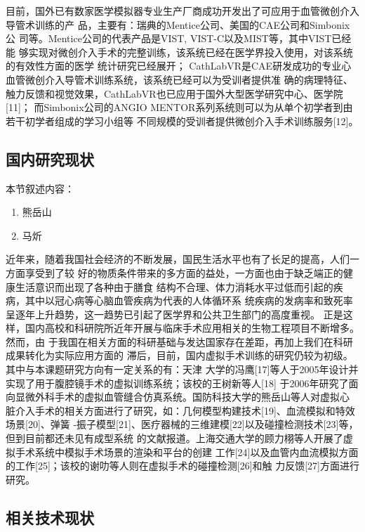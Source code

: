 目前，国外已有数家医学模拟器专业生产厂商成功开发出了可应用于血管微创介入导管术训练的产
品，主要有：瑞典的Mentice公司\cite{menticeweb}、美国的CAE公司\cite{caeweb}和Simbonix公
司\cite{simbionixweb}等。Mentice公司的代表产品是VIST, VIST-C以及MIST等，其中VIST已经能
够实现对微创介入手术的完整训练，该系统已经在医学界投入使用，对该系统的有效性方面的医学
统计研究已经展开\cite{duncan2006analysis}\cite{tedesco2008simulation}\cite{glaiberman2008simulation}；
CathLabVR是CAE研发成功的专业心血管微创介入导管术训练系统，该系统已经可以为受训者提供准
确的病理特征、触力反馈和视觉效果，CathLabVR也已应用于国外大型医学研究中心、医学院[11]；
而Simbonix公司的ANGIO MENTOR系列系统则可以为从单个初学者到由若干初学者组成的学习小组等
不同规模的受训者提供微创介入手术训练服务[12]。

\subsection{国内研究现状}

本节叙述内容：
\begin{enumerate}
  \item 熊岳山
  \item 马炘
\end{enumerate}

近年来，随着我国社会经济的不断发展，国民生活水平也有了长足的提高，人们一方面享受到了较
好的物质条件带来的多方面的益处，一方面也由于缺乏端正的健康生活意识而出现了各种由于膳食
结构不合理、体力消耗水平过低而引起的疾病，其中以冠心病等心脑血管疾病为代表的人体循环系
统疾病的发病率和致死率呈逐年上升趋势，这一趋势已引起了医学界和公共卫生部门的高度重视。
正是这样，国内高校和科研院所近年开展与临床手术应用相关的生物工程项目不断增多。然而，由
于我国在相关方面的科研基础与发达国家存在差距，再加上我们在科研成果转化为实际应用方面的
滞后，目前，国内虚拟手术训练的研究仍较为初级。其中与本课题研究方向有一定关系的有：天津
大学的冯鹰[17]等人于2005年设计并实现了用于腹腔镜手术的虚拟训练系统；该校的王树新等人[18]
于2006年研究了面向显微外科手术的虚拟血管缝合仿真系统。国防科技大学的熊岳山等人对虚拟心
脏介入手术的相关方面进行了研究，如：几何模型构建技术[19]、血流模拟和特效场景[20]、弹簧
-振子模型[21]、医疗器械的三维建模[22]以及碰撞检测技术[23]等，但到目前都还未见有成型系统
的文献报道。上海交通大学的顾力栩等人开展了虚拟手术系统中模拟手术场景的渲染和平台的创建
工作[24]以及血管内血流模拟方面的工作[25]；该校的谢叻等人则在虚拟手术的碰撞检测[26]和触
力反馈[27]方面进行研究。

\subsection{相关技术现状}

